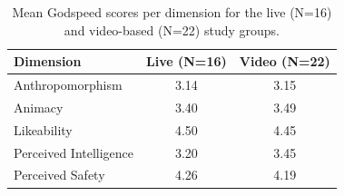 \begin{table}[H]
\centering
\begin{tabular}{lcc}
\toprule
\textbf{Dimension} & \textbf{Live (N=16)} & \textbf{Video (N=22)} \\
\midrule
Anthropomorphism    & 3.14 & 3.15 \\
Animacy             & 3.40 & 3.49 \\
Likeability         & 4.50 & 4.45 \\
Perceived Intelligence & 3.20 & 3.45 \\
Perceived Safety    & 4.26 & 4.19 \\
\bottomrule
\end{tabular}
\caption[Mean Godspeed scores per dimension for both groups]{Mean Godspeed scores per dimension for the live (N=16) and 
video-based (N=22) study groups.}
\label{tab:godspeed_means}
\end{table}